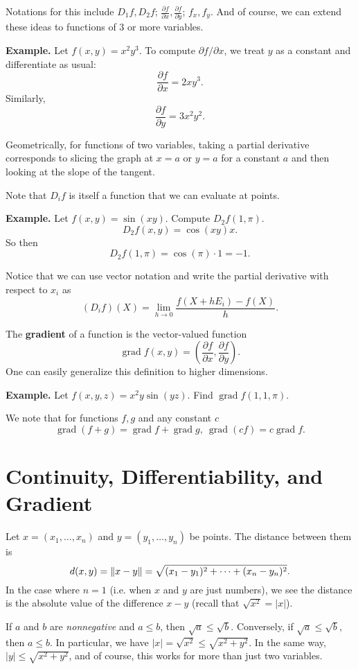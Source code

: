 \documentclass{article}
\DeclareMathOperator{\grd}{grad}
\begin{document}
Notations for this include $D_1 f, D_2 f$; $\frac{\partial f}{\partial x}, \frac{\partial f}{\partial y}$; $f_x, f_y$. 
And of course, we can extend these ideas to functions of $3$ or more variables.

\textbf{Example.} Let $f(x,y) = x^2 y^3$. To compute $\partial f / \partial x$, we treat $y$ as a constant
and differentiate as usual:
\[\frac{\partial f}{\partial x} = 2xy^3.\]
Similarly, 
\[\frac{\partial f}{\partial y} = 3x^2y^2.\]

Geometrically, for functions of two variables, taking a partial derivative corresponds to 
slicing the graph at $x=a$ or $y=a$ for a constant $a$ and then 
looking at the slope of the tangent.

Note that $D_i f$ is itself a function that we can evaluate at points.

\textbf{Example.} Let $f(x,y) = \sin(xy)$. Compute $D_2 f (1,\pi)$.
\[D_2 f(x,y) = \cos(xy)x.\]
So then 
\[D_2 f(1,\pi) = \cos(\pi)\cdot 1 = -1.\]

Notice that we can use vector notation and write the partial derivative with respect to $x_i$ as 
\[(D_i f)(X) = \lim_{h \to 0} \frac{f(X+hE_i)-f(X)}{h}.\]

The \textbf{gradient} of a function is the vector-valued function
\[\grd f(x,y) = \left( \frac{\partial f}{\partial x}, \frac{\partial f}{\partial y} \right).\]
One can easily generalize this definition to higher dimensions. 

\textbf{Example.} Let $f(x,y,z) = x^2 y \sin(yz)$. Find $\grd f(1,1,\pi)$.

We note that for functions $f,g$ and any constant $c$
\[\grd(f+g)=\grd f + \grd g,\ \grd(cf)=c \grd f.\]

\section*{Continuity, Differentiability, and Gradient}

Let $x=(x_1,\ldots,x_n)$ and $y=(y_1,\ldots,y_n)$ be points. The distance
between them is 
\[ d(x,y)=\norm{x-y}= \sqrt{(x_1-y_1)^2+\cdots+(x_n-y_n)^2} .\]
In the case where $n=1$ (i.e. when $x$ and $y$ are just numbers), we see
the distance is the absolute value of the difference $x-y$ (recall that $\sqrt{x^2}=|x|$).

If $a$ and $b$ are \emph{nonnegative} and $a\leq b$, then 
$\sqrt{a} \leq \sqrt{b}$. Conversely, if $\sqrt{a} \leq \sqrt{b}$, then $a\leq b$. In particular,
we have $|x|=\sqrt{x^2} \leq \sqrt{x^2 + y^2}$. In the same way, $|y| \leq \sqrt{x^2+y^2}$, and of course,
this works for more than just two variables.
\end{document}
